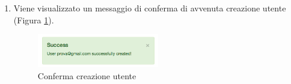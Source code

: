 \begin{enumerate}
			\item Viene visualizzato un messaggio di conferma di avvenuta creazione utente (Figura \ref{fig:confermaCreazioneUtente}).

				\begin{figure}[H]
					\centering \includegraphics[width=0.5\textwidth]{img/confermaCreazioneUtente.png}
					\caption{ \label{fig:confermaCreazioneUtente} Conferma creazione utente}
				\end{figure}

		\end{enumerate}  

	\clearpage
